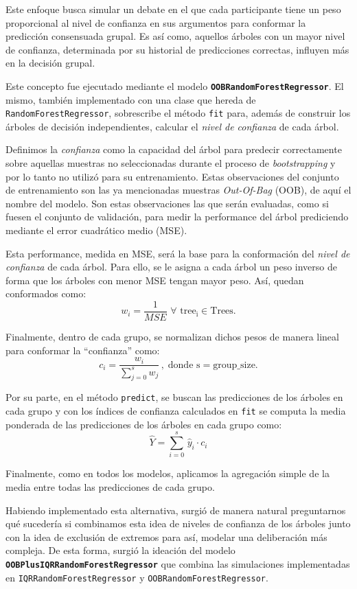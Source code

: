 Este enfoque busca simular un debate en el que cada participante tiene un peso proporcional al nivel de confianza en sus argumentos para conformar la predicción consensuada grupal. Es así como, aquellos árboles con un mayor nivel de confianza, determinada por su historial de predicciones correctas, influyen más en la decisión grupal.

Este concepto fue ejecutado mediante el modelo \textbf{\texttt{OOBRandomForestRegressor}}. El mismo, también implementado con una clase que hereda de \texttt{RandomForestRegressor}, sobrescribe el método \texttt{fit} para, además de construir los árboles de decisión independientes, calcular el \textit{nivel de confianza} de cada árbol.

Definimos la \textit{confianza} como la capacidad del árbol para predecir correctamente sobre aquellas muestras no seleccionadas durante el proceso de \textit{bootstrapping} y por lo tanto no utilizó para su entrenamiento. Estas observaciones del conjunto de entrenamiento son las ya mencionadas muestras \textit{Out-Of-Bag} (OOB), de aquí el nombre del modelo. Son estas observaciones las que serán evaluadas, como si fuesen el conjunto de validación, para medir la performance del árbol prediciendo mediante el error cuadrático medio (MSE). 

Esta performance, medida en MSE, será la base para la conformación del \textit{nivel de confianza} de cada árbol. Para ello, se le asigna a cada árbol un peso inverso de forma que los árboles con menor MSE tengan mayor peso. Así, quedan conformados como: 
\[
w_i = \frac{1}{MSE} \,\, \forall \,\, \mathrm{tree_i} \in \mathrm{Trees}.
\]

Finalmente, dentro de cada grupo, se normalizan dichos pesos de manera lineal para conformar la “confianza” como:
\[
c_i = \frac{w_i}{\sum_{j=0}^{s} w_j}\,, \; \text{donde} \,\, \mathrm{s = group\_size}.
\]

Por su parte, en el método \texttt{predict}, se buscan las predicciones de los árboles en cada grupo y con los índices de confianza calculados en \texttt{fit} se computa la media ponderada de las predicciones de los árboles en cada grupo como:
\[
\hat{Y} = \sum_{i=0}^{s} \, \hat{y}_i \cdot c_i
\]

Finalmente, como en todos los modelos, aplicamos la agregación simple de la media entre todas las predicciones de cada grupo.

Habiendo implementado esta alternativa, surgió de manera natural preguntarnos qué sucedería si combinamos esta idea de niveles de confianza de los árboles junto con la idea de exclusión de extremos para así, modelar una deliberación más compleja. De esta forma, surgió la ideación del modelo \textbf{\texttt{OOBPlusIQRRandomForestRegressor}} que combina las simulaciones implementadas en \texttt{IQRRandomForestRegressor} y \texttt{OOBRandomForestRegressor}.

